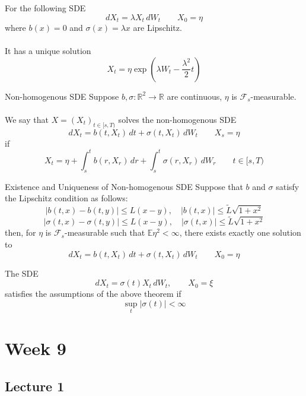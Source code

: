 \documentclass[12pt,a4paper]{article}
\newcommand{\R}{\mathbb{R}}
\newcommand{\E}{\mathbb{E}}
\begin{document}
    \begin{example}{}{}
        For the following SDE
        $$
        dX_t = \lambda X_t\, dW_t\qquad X_0=\eta
        $$
        where $b(x)=0$ and $\sigma(x) = \lambda x$ are Lipschitz.\\
        \\
        It has a unique solution
        $$
        X_t = \eta \exp\left(\lambda W_t -\frac{\lambda^2}{2}t\right)
        $$
    \end{example}
    \pagebreak
    \begin{definition}{Non-homogenous SDE}{}
        Suppose $b,\sigma:\R^2\to \R$ are continuous, $\eta$ is $\mathscr{F}_s$-measurable.\\
        \\
        We say that $X = (X_t)_{t\in[s,T)}$ solves the non-homogenous SDE
        $$
        dX_t = b(t,X_t)\, dt + \sigma(t,X_t)\, dW_t\qquad X_s=\eta
        $$
        if
        $$
        X_t  = \eta + \int_s^t b(r,X_r) \, dr + \int_s^t \sigma(r,X_r)\, dW_r\qquad t\in [s,T)
        $$
    \end{definition}
    \begin{theorem}{Existence and Uniqueness of Non-homogenous SDE}{}
        Suppose that $b$ and $\sigma$ satisfy the Lipschitz condition as follows:
        $$
        |b(t,x)-b(t,y)|\le L(x-y), \quad |b(t,x)|\le \tilde L\sqrt{1+x^2}
        $$
        $$
        |\sigma(t,x)-\sigma(t,y)|\le L(x-y), \quad |\sigma(t,x)|\le \tilde L\sqrt{1+x^2}
        $$
        then, for $\eta$ is $\mathscr{F}_s$-measurable such that $\E\eta^2<\infty$, there exists exactly one solution to 
        $$
        dX_t = b(t,X_t)\, dt + \sigma(t,X_t)\, dW_t\qquad X_0=\eta
        $$
    \end{theorem}
    \begin{example}{}{}
        The SDE
        $$
        dX_t = \sigma(t)X_t\, dW_t, \qquad X_0=\xi
        $$
        satisfies the assumptions of the above theorem if
        $$
        \sup_t |\sigma(t)|<\infty
        $$
    \end{example}
    \pagebreak
    \section{Week 9}
    \subsection{Lecture 1}
\end{document}

